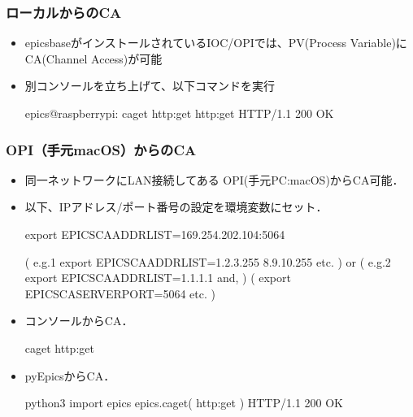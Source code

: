 \documentclass[letterpaper,10pt,dvipdfmx]{sphinxmanual}
\begin{document}
\subsubsection{ローカルからのCA}
\label{\detokenize{epics/rst/example1__httpRequest_to_Google:ca}}\begin{itemize}
\item {} 
epics\sphinxhyphen{}baseがインストールされているIOC/OPIでは、PV(Process Variable)にCA(Channel Access)が可能

\item {} 
別コンソールを立ち上げて、以下コマンドを実行

\begin{sphinxVerbatim}[commandchars=\\\{\}]
epics@raspberrypi: \PYGZti{} \PYGZdl{} caget http:get
http:get  HTTP/1.1 200 OK
\end{sphinxVerbatim}

\end{itemize}


\subsubsection{OPI（手元macOS）からのCA}
\label{\detokenize{epics/rst/example1__httpRequest_to_Google:opi-macos-ca}}\begin{itemize}
\item {} 
同一ネットワークにLAN接続してある OPI(手元PC:macOS)からCA可能．

\item {} 
以下、IPアドレス/ポート番号の設定を環境変数にセット．

\begin{sphinxVerbatim}[commandchars=\\\{\}]
\PYGZdl{} export EPICS\PYGZus{}CA\PYGZus{}ADDR\PYGZus{}LIST=\PYGZdq{}169.254.202.104:5064\PYGZdq{}


( e.g.1 \PYGZdl{} export EPICS\PYGZus{}CA\PYGZus{}ADDR\PYGZus{}LIST=\PYGZdq{}1.2.3.255 8.9.10.255\PYGZdq{} etc. )
or
( e.g.2 \PYGZdl{} export EPICS\PYGZus{}CA\PYGZus{}ADDR\PYGZus{}LIST=\PYGZdq{}1.1.1.1\PYGZdq{} and,  )
(       \PYGZdl{} export EPICS\PYGZus{}CA\PYGZus{}SERVER\PYGZus{}PORT=5064 etc.     )
\end{sphinxVerbatim}

\item {} 
コンソールからCA．

\begin{sphinxVerbatim}[commandchars=\\\{\}]
\PYGZdl{} caget http:get
\end{sphinxVerbatim}

\item {} 
pyEpicsからCA．

\begin{sphinxVerbatim}[commandchars=\\\{\}]
\PYGZdl{} python3
\PYGZgt{}\PYGZgt{}\PYGZgt{} import epics
\PYGZgt{}\PYGZgt{}\PYGZgt{} epics.caget( \PYGZdq{}http:get\PYGZdq{} )
\PYGZsq{}HTTP/1.1 200 OK\PYGZsq{}
\end{sphinxVerbatim}

\end{itemize}
\end{document}
